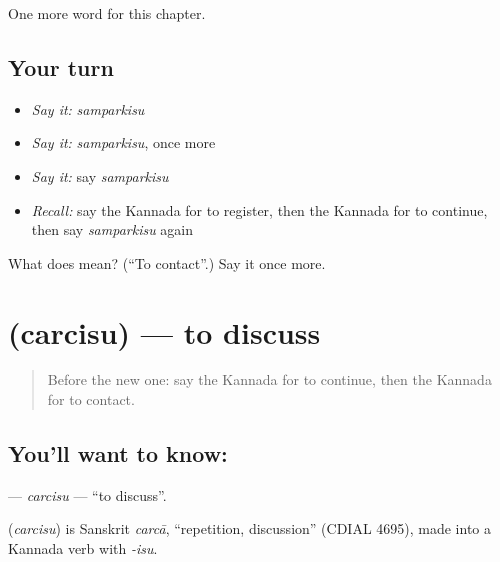 \begin{grammarlens}[title={What you've built}]
One more word for this chapter.
\end{grammarlens}

\subsection*{Your turn}
\begin{itemize}
\raggedright
  \item \emph{Say it:} \emph{samparkisu}
  \item \emph{Say it:} \emph{samparkisu}, once more
  \item \emph{Say it:} say \emph{samparkisu}
  \item \emph{Recall:} say the Kannada for to register, then the Kannada for to continue, then say \emph{samparkisu} again
\end{itemize}

\begin{tcolorbox}[breakable,colback=teal!4,colframe=teal!35!black,title={Before you move on}]
What does  mean? (\textquotedblleft{}To contact\textquotedblright{}.) Say it once more.
\end{tcolorbox}
\section[\texorpdfstring{\kn{ಚರ್ಚಿಸು} (carcisu)}{ಚರ್ಚಿಸು (carcisu)}]{ (carcisu) — to discuss}

\label{lesson:KA-C202-carcisu}



\begin{quote}
Before the new one: say the Kannada for to continue, then the Kannada for to contact.
\end{quote}

\subsection*{You'll want to know: }
\textbf{} — \emph{carcisu} — \textquotedblleft{}to discuss\textquotedblright{}.

\begin{cousinweb}
\textbf{} (\emph{carcisu}) is Sanskrit \emph{carcā}, \textquotedblleft{}repetition, discussion\textquotedblright{} (CDIAL 4695), made into a Kannada verb with \emph{-isu}.
\end{cousinweb}

